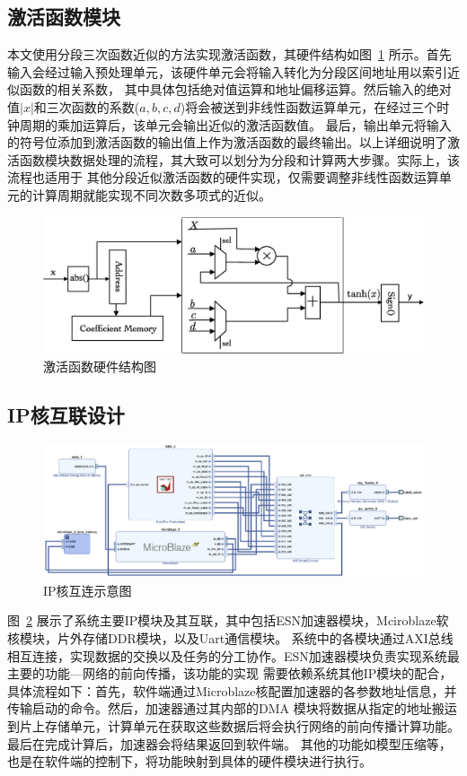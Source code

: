 \subsection{激活函数模块}
本文使用分段三次函数近似的方法实现激活函数，其硬件结构如图~\ref{fig:tanh} 所示。首先输入会经过输入预处理单元，该硬件单元会将输入转化为分段区间地址用以索引近似函数的相关系数，
其中具体包括绝对值运算和地址偏移运算。然后输入的绝对值\(|x|\)和三次函数的系数(\(a,b,c,d\))将会被送到非线性函数运算单元，在经过三个时钟周期的乘加运算后，该单元会输出近似的激活函数值。
最后，输出单元将输入的符号位添加到激活函数的输出值上作为激活函数的最终输出。以上详细说明了激活函数模块数据处理的流程，其大致可以划分为分段和计算两大步骤。实际上，该流程也适用于
其他分段近似激活函数的硬件实现，仅需要调整非线性函数运算单元的计算周期就能实现不同次数多项式的近似。
\begin{figure}[htbp]
	\centering
	\includegraphics[width=1\columnwidth]{exp/fig_activation_hard.eps}
	\caption{激活函数硬件结构图}
	\label{fig:tanh}
\end{figure}
\subsection{IP核互联设计}
\begin{figure}[htbp]
	\centering
	\includegraphics[width=1\columnwidth]{exp/fig_blockDesign.eps}
	\caption{IP核互连示意图}
	\label{fig:blockDesign}
\end{figure}
图~\ref{fig:blockDesign} 展示了系统主要IP模块及其互联，其中包括ESN加速器模块，Mciroblaze软核模块，片外存储DDR模块，以及Uart通信模块。
系统中的各模块通过AXI总线相互连接，实现数据的交换以及任务的分工协作。ESN加速器模块负责实现系统最主要的功能---网络的前向传播，该功能的实现
需要依赖系统其他IP模块的配合，具体流程如下：首先，软件端通过Microblaze核配置加速器的各参数地址信息，并传输启动的命令。然后，加速器通过其内部的DMA
模块将数据从指定的地址搬运到片上存储单元，计算单元在获取这些数据后将会执行网络的前向传播计算功能。最后在完成计算后，加速器会将结果返回到软件端。
其他的功能如模型压缩等，也是在软件端的控制下，将功能映射到具体的硬件模块进行执行。


